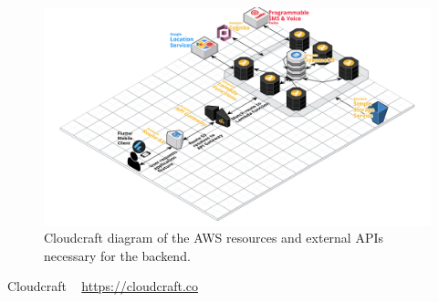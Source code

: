 \documentclass[10pt, a4paper]{article}
\begin{document}
\begin{figure}[H]
\begin{center}
\centerline{
	\includegraphics[scale=.15]{EmergenSeek-Backend.PNG}
}
\caption{Cloudcraft \cite{one} diagram of the AWS resources and external APIs necessary for the backend.}
\label{fig:1}	
\end{center}	
\end{figure}
	
\begin{thebibliography}{9}
Cloudcraft ~ \url{https://cloudcraft.co}

\end{thebibliography}
\end{document}
